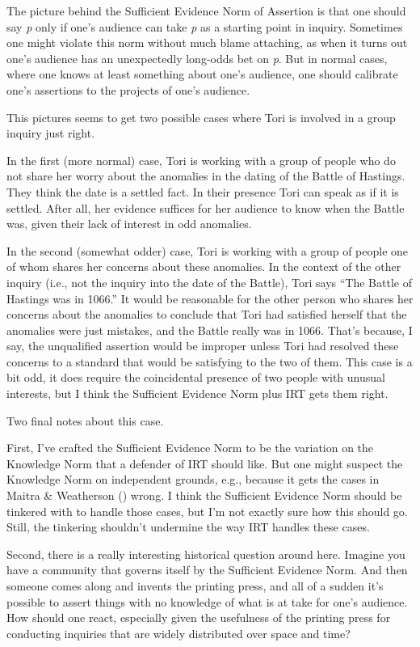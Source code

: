 \documentclass[
  12pt,
  letterpaper,
]{scrbook}
\begin{document}
The picture behind the Sufficient Evidence Norm of Assertion is that one
should say \emph{p} only if one's audience can take \emph{p} as a
starting point in inquiry. Sometimes one might violate this norm without
much blame attaching, as when it turns out one's audience has an
unexpectedly long-odds bet on \emph{p}. But in normal cases, where one
knows at least something about one's audience, one should calibrate
one's assertions to the projects of one's audience.

This pictures seems to get two possible cases where Tori is involved in
a group inquiry just right.

In the first (more normal) case, Tori is working with a group of people
who do not share her worry about the anomalies in the dating of the
Battle of Hastings. They think the date is a settled fact. In their
presence Tori can speak as if it is settled. After all, her evidence
suffices for her audience to know when the Battle was, given their lack
of interest in odd anomalies.

In the second (somewhat odder) case, Tori is working with a group of
people one of whom shares her concerns about these anomalies. In the
context of the other inquiry (i.e., not the inquiry into the date of the
Battle), Tori says ``The Battle of Hastings was in 1066.'' It would be
reasonable for the other person who shares her concerns about the
anomalies to conclude that Tori had satisfied herself that the anomalies
were just mistakes, and the Battle really was in 1066. That's because, I
say, the unqualified assertion would be improper unless Tori had
resolved these concerns to a standard that would be satisfying to the
two of them. This case is a bit odd, it does require the coincidental
presence of two people with unusual interests, but I think the
Sufficient Evidence Norm plus IRT gets them right.

Two final notes about this case.

First, I've crafted the Sufficient Evidence Norm to be the variation on
the Knowledge Norm that a defender of IRT should like. But one might
suspect the Knowledge Norm on independent grounds, e.g., because it gets
the cases in Maitra \& Weatherson
() wrong. I think the
Sufficient Evidence Norm should be tinkered with to handle those cases,
but I'm not exactly sure how this should go. Still, the tinkering
shouldn't undermine the way IRT handles these cases.

Second, there is a really interesting historical question around here.
Imagine you have a community that governs itself by the Sufficient
Evidence Norm. And then someone comes along and invents the printing
press, and all of a sudden it's possible to assert things with no
knowledge of what is at take for one's audience. How should one react,
especially given the usefulness of the printing press for conducting
inquiries that are widely distributed over space and time?
\end{document}
